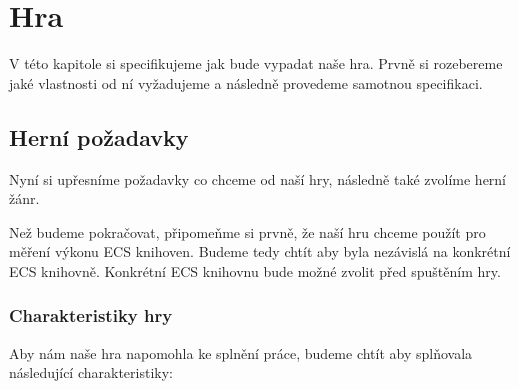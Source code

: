 \chapter{Hra}
V této kapitole si specifikujeme jak bude vypadat naše hra. Prvně si rozebereme jaké vlastnosti od ní vyžadujeme a následně provedeme samotnou specifikaci.

\section{Herní požadavky}
Nyní si upřesníme požadavky co chceme od naší hry, následně také zvolíme herní žánr.

Než budeme pokračovat, připomeňme si prvně, že naší hru chceme použít pro měření výkonu ECS knihoven. Budeme tedy chtít aby byla nezávislá na konkrétní ECS knihovně. Konkrétní ECS knihovnu bude možné zvolit před spuštěním hry.

\subsection{Charakteristiky hry}
\label{sec:game-characteristics}
Aby nám naše hra napomohla ke splnění práce, budeme chtít aby splňovala následující charakteristiky:

